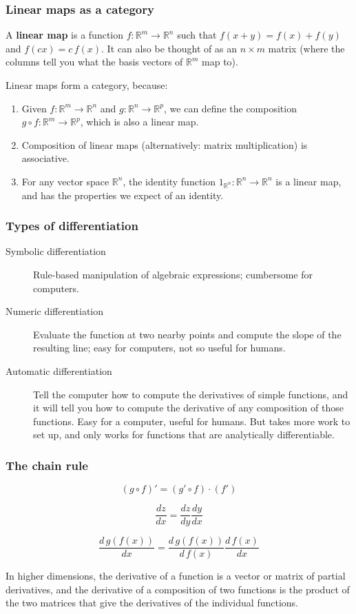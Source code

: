 \documentclass[10pt]{beamer}
\theoremstyle{definition}
\theoremstyle{remark}
\numberwithin{equation}{section}
\begin{document}
\begin{frame}[fragile]{}
  \frametitle{Linear maps as a category}

  A \textbf{linear map} is a function $f\colon \mathbb{R}^m \rightarrow \mathbb{R}^n$
  such that $f(x + y) = f(x) + f(y)$ and $f(cx) = c\,f(x)$.
  It can also be thought of as an $n \times m$ matrix (where the columns tell you
  what the basis vectors of $\mathbb{R}^m$ map to).

  Linear maps form a category, because:
  \begin{enumerate}
  \item Given $f\colon \mathbb{R}^m \rightarrow \mathbb{R}^n$ and $g\colon \mathbb{R}^n \rightarrow
    \mathbb{R}^p$, we can define the composition $g \circ f \colon \mathbb{R}^m \rightarrow
    \mathbb{R}^p$, which is also a linear map.
  \item Composition of linear maps (alternatively: matrix multiplication) is
    associative.
  \item For any vector space $\mathbb{R}^n$, the identity function
    $1_{\mathbb{R}^n}\colon \mathbb{R}^n \rightarrow \mathbb{R}^n$ is a linear map, and
    has the properties we expect of an identity.
  \end{enumerate}
\end{frame}

\begin{frame}[fragile]
  \frametitle{Types of differentiation}

  \begin{description}
  \item[Symbolic differentiation] Rule-based manipulation of algebraic
    expressions; cumbersome for computers.
  \item[Numeric differentiation] Evaluate the function at two nearby points and
    compute the slope of the resulting line; easy for computers, not so useful
    for humans.
  \item[Automatic differentiation] Tell the computer how to compute the
    derivatives of simple functions, and it will tell you how to compute the
    derivative of any composition of those functions. Easy for a computer,
    useful for humans. But takes more work to set up, and only works for
    functions that are analytically differentiable.
  \end{description}
\end{frame}

\begin{frame}[fragile]
  \frametitle{The chain rule}

  \[(g \circ f)' = (g' \circ f) \cdot (f')\]

  \[\frac{dz}{dx} = \frac{dz}{dy} \frac{dy}{dx}\]

  \[\frac{d\,g(f(x))}{dx} = \frac{d\,g(f(x))}{d\,f(x)} \frac{d\,f(x)}{dx}\]

  In higher dimensions, the derivative of a function is a vector or matrix of
  partial derivatives,
  and the derivative of a composition of two functions is the product of the two
  matrices that give the derivatives of the individual functions.

\end{frame}
\end{document}
